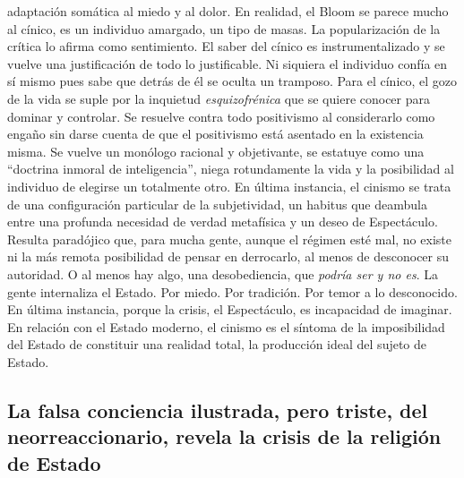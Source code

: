 \documentclass[
]{article}
\begin{document}
adaptación somática al miedo y al dolor. En realidad, el Bloom se parece
mucho al cínico, es un individuo amargado, un tipo de masas. La
popularización de la crítica lo afirma como sentimiento. El saber del
cínico es instrumentalizado y se vuelve una justificación de todo lo
justificable. Ni siquiera el individuo confía en sí mismo pues sabe que
detrás de él se oculta un tramposo. Para el cínico, el gozo de la vida
se suple por la inquietud \emph{esquizofrénica} que se quiere conocer
para dominar y controlar. Se resuelve contra todo positivismo al
considerarlo como engaño sin darse cuenta de que el positivismo está
asentado en la existencia misma. Se vuelve un monólogo racional y
objetivante, se estatuye como una ``doctrina inmoral de inteligencia'',
niega rotundamente la vida y la posibilidad al individuo de elegirse un
totalmente otro. En última instancia, el cinismo se trata de una
configuración particular de la subjetividad, un habitus que deambula
entre una profunda necesidad de verdad metafísica y un deseo de
Espectáculo. Resulta paradójico que, para mucha gente, aunque el régimen
esté mal, no existe ni la más remota posibilidad de pensar en
derrocarlo, al menos de desconocer su autoridad. O al menos hay algo,
una desobediencia, que \emph{podría ser y no es}. La gente internaliza
el Estado. Por miedo. Por tradición. Por temor a lo desconocido. En
última instancia, porque la crisis, el Espectáculo, es incapacidad de
imaginar. En relación con el Estado moderno, el cinismo es el síntoma de
la imposibilidad del Estado de constituir una realidad total, la
producción ideal del sujeto de Estado.

\hypertarget{la-falsa-conciencia-ilustrada-pero-triste-del-neorreaccionario-revela-la-crisis-de-la-religiuxf3n-de-estado}{%
\subsection{La falsa conciencia ilustrada, pero triste, del
neorreaccionario, revela la crisis de la religión de
Estado}\label{la-falsa-conciencia-ilustrada-pero-triste-del-neorreaccionario-revela-la-crisis-de-la-religiuxf3n-de-estado}}
\end{document}
